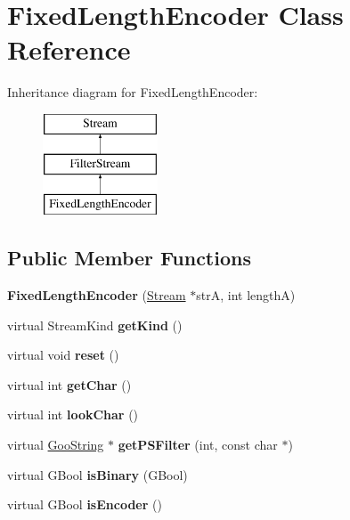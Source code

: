 \hypertarget{class_fixed_length_encoder}{}\section{Fixed\+Length\+Encoder Class Reference}
\label{class_fixed_length_encoder}
Inheritance diagram for Fixed\+Length\+Encoder\+:\begin{figure}[H]
\begin{center}
\leavevmode
\includegraphics[height=3.000000cm]{class_fixed_length_encoder}
\end{center}
\end{figure}
\subsection*{Public Member Functions}
\begin{DoxyCompactItemize}
\item 
\mbox{\label{class_fixed_length_encoder_a8738e01c1cccbbe1d00e2f56b5bf7595}} 
{\bfseries Fixed\+Length\+Encoder} (\hyperlink{class_stream}{Stream} $\ast$strA, int lengthA)
\item 
\mbox{\label{class_fixed_length_encoder_a917a24a51b1790360c8639765c252a22}} 
virtual Stream\+Kind {\bfseries get\+Kind} ()
\item 
\mbox{\label{class_fixed_length_encoder_ab9ea5739d1f43901057a6ee6d1d48ae6}} 
virtual void {\bfseries reset} ()
\item 
\mbox{\label{class_fixed_length_encoder_a14418babb732f6d748a1463222b92600}} 
virtual int {\bfseries get\+Char} ()
\item 
\mbox{\label{class_fixed_length_encoder_a1ac81e02ddaaf9f8dd8d082c3cd78bb5}} 
virtual int {\bfseries look\+Char} ()
\item 
\mbox{\label{class_fixed_length_encoder_aec96e2bb874500804090030e1f2057ce}} 
virtual \hyperlink{class_goo_string}{Goo\+String} $\ast$ {\bfseries get\+P\+S\+Filter} (int, const char $\ast$)
\item 
\mbox{\label{class_fixed_length_encoder_a54038726c55959de0305cfdaa7a0ca66}} 
virtual G\+Bool {\bfseries is\+Binary} (G\+Bool)
\item 
\mbox{\label{class_fixed_length_encoder_ac4bcce87e04f538326651714ba4e6b83}} 
virtual G\+Bool {\bfseries is\+Encoder} ()
\end{DoxyCompactItemize}
